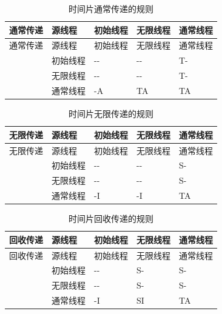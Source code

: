 \begin{xltabular}{\textwidth}{@{}>{\hsize\raggedright\arraybackslash}X>{\hsize\raggedright\arraybackslash}X>{\hsize\raggedright\arraybackslash}X>{\hsize\raggedright\arraybackslash}X>{\hsize\raggedright\arraybackslash}X@{}}
\caption{时间片通常传递的规则}\label{tab:4-4-normal-time-transfer-rules}\\
\toprule
通常传递 & 源线程 & 初始线程 & 无限线程 & 通常线程\tabularnewline
\endfirsthead
\toprule
通常传递 & 源线程 & 初始线程 & 无限线程 & 通常线程\tabularnewline
\midrule
\endhead
\bottomrule
\endlastfoot
{} & 初始线程 & -\/- & -\/- & T-\tabularnewline
& 无限线程 & -\/- & -\/- & T-\tabularnewline
& 通常线程 & -A & TA & TA\tabularnewline
\end{xltabular}

\begin{xltabular}{\textwidth}{@{}>{\hsize\raggedright\arraybackslash}X>{\hsize\raggedright\arraybackslash}X>{\hsize\raggedright\arraybackslash}X>{\hsize\raggedright\arraybackslash}X>{\hsize\raggedright\arraybackslash}X@{}}
\caption{时间片无限传递的规则}\label{tab:4-5-infinite-time-transfer-rules}\\
\toprule
无限传递 & 源线程 & 初始线程 & 无限线程 & 通常线程\tabularnewline
\endfirsthead
\toprule
无限传递 & 源线程 & 初始线程 & 无限线程 & 通常线程\tabularnewline
\midrule
\endhead
\bottomrule
\endlastfoot
{} & 初始线程 & -\/- & -\/- & S-\tabularnewline
& 无限线程 & -\/- & -\/- & S-\tabularnewline
& 通常线程 & -I & -I & TA\tabularnewline
\end{xltabular}

\begin{xltabular}{\textwidth}{@{}>{\hsize\raggedright\arraybackslash}X>{\hsize\raggedright\arraybackslash}X>{\hsize\raggedright\arraybackslash}X>{\hsize\raggedright\arraybackslash}X>{\hsize\raggedright\arraybackslash}X@{}}
\caption{时间片回收传递的规则}\label{tab:4-6-reclaim-time-transfer-rules}\\
\toprule
回收传递 & 源线程 & 初始线程 & 无限线程 & 通常线程\tabularnewline
\endfirsthead
\toprule
回收传递 & 源线程 & 初始线程 & 无限线程 & 通常线程\tabularnewline
\midrule
\endhead
\bottomrule
\endlastfoot
{} & 初始线程 & -\/- & S- & S-\tabularnewline
& 无限线程 & -\/- & S- & S-\tabularnewline
& 通常线程 & -I & SI & TA\tabularnewline
\end{xltabular}

